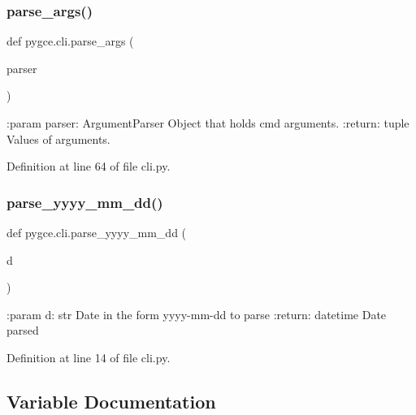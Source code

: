 \subsubsection{\texorpdfstring{parse\+\_\+args()}{parse\_args()}}
{\footnotesize\ttfamily def pygce.\+cli.\+parse\+\_\+args (\begin{DoxyParamCaption}\item[{}]{parser }\end{DoxyParamCaption})}

\begin{DoxyVerb}:param parser: ArgumentParser
    Object that holds cmd arguments.
:return: tuple
    Values of arguments.
\end{DoxyVerb}
 

Definition at line 64 of file cli.\+py.

\mbox{\label{namespacepygce_1_1cli_a807a6becfdbbb6dab4fede7208861afc}} 
\subsubsection{\texorpdfstring{parse\+\_\+yyyy\+\_\+mm\+\_\+dd()}{parse\_yyyy\_mm\_dd()}}
{\footnotesize\ttfamily def pygce.\+cli.\+parse\+\_\+yyyy\+\_\+mm\+\_\+dd (\begin{DoxyParamCaption}\item[{}]{d }\end{DoxyParamCaption})}

\begin{DoxyVerb}:param d: str
    Date in the form yyyy-mm-dd to parse
:return: datetime
    Date parsed
\end{DoxyVerb}
 

Definition at line 14 of file cli.\+py.



\subsection{Variable Documentation}
\mbox{\label{namespacepygce_1_1cli_a13e8047ab788ce64d94c1077ad4218e5}} 
